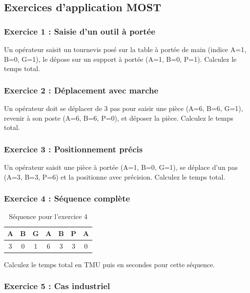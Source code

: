 \documentclass[a4paper,12pt]{article}
\begin{document}
\subsection{Exercices d'application MOST}

\subsubsection{Exercice 1 : Saisie d'un outil à portée}

Un opérateur saisit un tournevis posé sur la table à portée de main (indice A=1, B=0, G=1), le dépose sur un support à portée (A=1, B=0, P=1). Calculez le temps total.

\subsubsection{Exercice 2 : Déplacement avec marche}

Un opérateur doit se déplacer de 3 pas pour saisir une pièce (A=6, B=6, G=1), revenir à son poste (A=6, B=6, P=0), et déposer la pièce. Calculez le temps total.

\subsubsection{Exercice 3 : Positionnement précis}

Un opérateur saisit une pièce à portée (A=1, B=0, G=1), se déplace d'un pas (A=3, B=3, P=6) et la positionne avec précision. Calculez le temps total.

\subsubsection{Exercice 4 : Séquence complète}

\begin{table}[ht]
\centering
\begin{tabular}{|c|c|c|c|c|c|c|}
\hline
\textbf{A} & \textbf{B} & \textbf{G} & \textbf{A} & \textbf{B} & \textbf{P} & \textbf{A} \\
\hline
3 & 0 & 1 & 6 & 3 & 3 & 0 \\
\hline
\end{tabular}
\caption{Séquence pour l'exercice 4}
\end{table}

Calculez le temps total en TMU puis en secondes pour cette séquence.

\subsubsection{Exercice 5 : Cas industriel}
\end{document}
